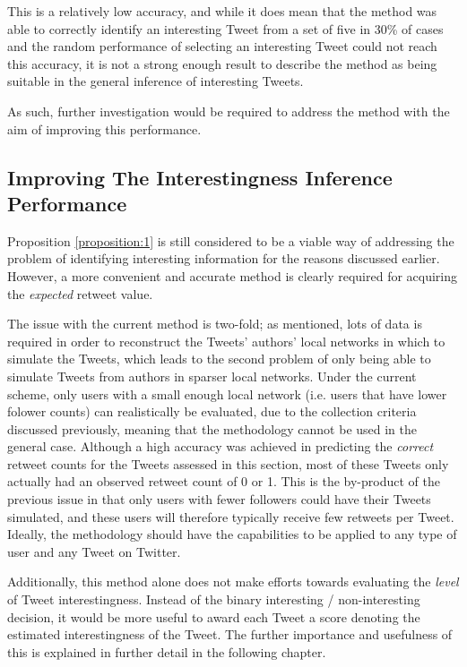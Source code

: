 This is a relatively low accuracy, and while it does mean that the method was able to correctly identify an interesting Tweet from a set of five in 30\% of cases and the random performance of selecting an interesting Tweet could not reach this accuracy, it is not a strong enough result to describe the method as being suitable in the general inference of interesting Tweets. 

As such, further investigation would be required to address the method with the aim of improving this performance.


\subsection{Improving The Interestingness Inference Performance}
Proposition \ref{proposition:1} is still considered to be a viable way of addressing the problem of identifying interesting information for the reasons discussed earlier. However, a more convenient and accurate method is clearly required for acquiring the \textit{expected} retweet value.

The issue with the current method is two-fold; as mentioned, lots of data is required in order to reconstruct the Tweets' authors' local networks in which to simulate the Tweets, which leads to the second problem of only being able to simulate Tweets from authors in sparser local networks. Under the current scheme, only users with a small enough local network (i.e. users that have lower folower counts) can realistically be evaluated, due to the collection criteria discussed previously, meaning that the methodology cannot be used in the general case. Although a high accuracy was achieved in predicting the \textit{correct} retweet counts for the Tweets assessed in this section, most of these Tweets only actually had an observed retweet count of 0 or 1. This is the by-product of the previous issue in that only users with fewer followers could have their Tweets simulated, and these users will therefore typically receive few retweets per Tweet. Ideally, the methodology should have the capabilities to be applied to any type of user and any Tweet on Twitter.

Additionally, this method alone does not make efforts towards evaluating the \textit{level} of Tweet interestingness. Instead of the binary interesting / non-interesting decision, it would be more useful to award each Tweet a score denoting the estimated interestingness of the Tweet. The further importance and usefulness of this is explained in further detail in the following chapter.


